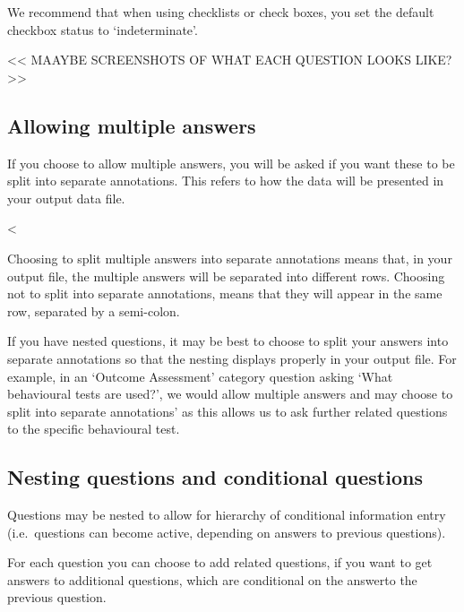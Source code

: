 \documentclass[
]{book}
\begin{document}
We recommend that when using checklists or check boxes, you set the default checkbox status to `indeterminate'.

\textless{}\textless{} MAAYBE SCREENSHOTS OF WHAT EACH QUESTION LOOKS LIKE?\textgreater{}\textgreater{}

\hypertarget{allowing-multiple-answers}{%
\subsection{Allowing multiple answers}\label{allowing-multiple-answers}}

If you choose to allow multiple answers, you will be asked if you want these to be split into separate annotations. This refers to how the data will be presented in your output data file.

\textless{}

\begin{quote}
\end{quote}

Choosing to split multiple answers into separate annotations means that, in your output file, the multiple answers will be separated into different rows. Choosing not to split into separate annotations, means that they will appear in the same row, separated by a semi-colon.

If you have nested questions, it may be best to choose to split your answers into separate annotations so that the nesting displays properly in your output file. For example, in an `Outcome Assessment' category question asking `What behavioural tests are used?', we would allow multiple answers and may choose to split into separate annotations' as this allows us to ask further related questions to the specific behavioural test.

\hypertarget{nesting-questions-and-conditional-questions}{%
\subsection{Nesting questions and conditional questions}\label{nesting-questions-and-conditional-questions}}

Questions may be nested to allow for hierarchy of conditional information entry (i.e.~questions can become active, depending on answers to previous questions).

For each question you can choose to add related questions, if you want to get answers to additional questions, which are conditional on the answerto the previous question.
\end{document}
